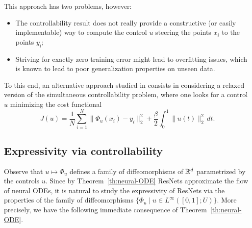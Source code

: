 This approach has two problems, however:
\begin{itemize}
    \item The controllability result does not really provide a constructive (or easily implementable) way to compute the control $u$ steering the points $x_i$ to the points $y_i$;
    \item Striving for exactly zero training error might lead to overfitting issues, which is known to lead to poor generalization properties on unseen data.
\end{itemize}

To this end, an alternative approach studied in \cite{scagliottiEnsembles2022} consists in considering a relaxed version of the simultaneous controllability problem, where one looks for a control $u$ minimizing the cost functional
\begin{equation}
    J(u) = \frac1N \sum_{i=1}^N \| \Phi_u(x_i) - y_i\|_2^2 + \frac{\beta}2 \int_0^1 \|u(t)\|_2^2\, dt.
\end{equation}


\subsection{Expressivity via controllability}



Observe that $u\mapsto \Phi_u$ defines a family of diffeomorphisms of $\mathbb{R}^d$ parametrized by the controls $u$.
Since by Theorem~\ref{th:neural-ODE} ResNets approximate the flow of neural ODEs, it is natural to study the expressivity of ResNets via the properties of the family of diffeomorphisms $\{\Phi_u \mid u\in L^\infty([0,1];U)\}$.
More precisely, we have the following immediate consequence of Theorem~\ref{th:neural-ODE}.

